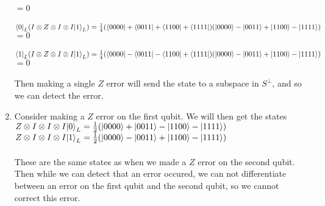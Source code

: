 \documentclass{assignment}
\begin{document}
\begin{problemlist}
\begin{answer}
\begin{enumerate}
      $=0$\\\\
      ${\left\langle{0}\right\vert}_L(I \otimes Z \otimes I \otimes I {\left\vert{1}\right\rangle}_L) =\frac{1}{4} ({\left\langle{0000}\right\vert} + {\left\langle{0011}\right\vert} + {\left\langle{1100}\right\vert} + {\left\langle{1111}\right\vert})({\left\vert{0000}\right\rangle} - {\left\vert{0011}\right\rangle} + {\left\vert{1100}\right\rangle} - {\left\vert{1111}\right\rangle})$\\
      $=0$\\\\
      ${\left\langle{1}\right\vert}_L(I \otimes Z \otimes I \otimes I {\left\vert{1}\right\rangle}_L) =\frac{1}{4} ({\left\langle{0000}\right\vert} - {\left\langle{0011}\right\vert} - {\left\langle{1100}\right\vert} + {\left\langle{1111}\right\vert})({\left\vert{0000}\right\rangle} - {\left\vert{0011}\right\rangle} + {\left\vert{1100}\right\rangle} - {\left\vert{1111}\right\rangle})$\\
      $=0$\\\\
      Then making a single $Z$ error will send the state to a subspace in $S^\perp$, and so we can detect the error.\\
    \item
      Consider making a $Z$ error on the first qubit. We will then get the states\\
      $Z \otimes I \otimes I \otimes I {\left\vert{0}\right\rangle}_L =\frac{1}{2} ({\left\vert{0000}\right\rangle} + {\left\vert{0011}\right\rangle} - {\left\vert{1100}\right\rangle} - {\left\vert{1111}\right\rangle})$\\
      $Z \otimes I \otimes I \otimes I {\left\vert{1}\right\rangle}_L =\frac{1}{2} ({\left\vert{0000}\right\rangle} - {\left\vert{0011}\right\rangle} + {\left\vert{1100}\right\rangle} - {\left\vert{1111}\right\rangle})$\\\\
      These are the same states as when we made a $Z$ error on the second qubit. Then while we can detect that an error occured, we can not differentiate between an error on the first qubit and the second qubit, so we cannot correct this error.
    \end{enumerate}
  \end{answer}


\end{problemlist}
\end{document}

